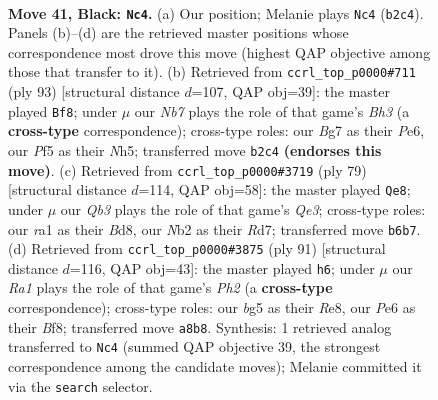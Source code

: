 \documentclass[11pt]{article}
\begin{document}
\clearpage

\begin{figure}[p]\centering
\begin{subfigure}{0.46\textwidth}\centering
\resizebox{\linewidth}{!}{%
\newchessgame
\chessboard[
  setfen={r3k3/6bp/bq2p3/p2p1pB1/P2p1Q1P/5N2/1n3P2/RNR3K1 b - - 3 41},
  showmover=false,
  pgfstyle=straightmove, color=movearrow, markmove={b2-c4}
]}
\caption{}
\end{subfigure}\hfill
\begin{subfigure}{0.46\textwidth}\centering
\resizebox{\linewidth}{!}{%
\newchessgame
\chessboard[
  setfen={4r1k1/1p3q2/1N2p2b/P2p1p1n/1R3P1P/3P1Q1P/5B2/6K1 b - - 4 47},
  showmover=false,
  pgfstyle=straightmove, color=movearrow, markmove={h6-f8}
]}
\caption{}
\end{subfigure}
\\[4pt]
\begin{subfigure}{0.46\textwidth}\centering
\resizebox{\linewidth}{!}{%
\newchessgame
\chessboard[
  setfen={3b2k1/1b1r4/2p1qppQ/4p2p/1P2P2P/5N2/3B1PP1/R5K1 b - - 1 40},
  showmover=false,
  pgfstyle=straightmove, color=movearrow, markmove={e6-e8}
]}
\caption{}
\end{subfigure}\hfill
\begin{subfigure}{0.46\textwidth}\centering
\resizebox{\linewidth}{!}{%
\newchessgame
\chessboard[
  setfen={4rbk1/7p/pn2q3/2p1Pp2/5p2/P2Q1N1P/6PK/BR6 b - - 0 46},
  showmover=false,
  pgfstyle=straightmove, color=movearrow, markmove={h7-h6}
]}
\caption{}
\end{subfigure}
\caption{\textbf{Move 41, Black: \texttt{Nc4}.} (a) Our position; Melanie plays \texttt{Nc4} (\texttt{b2c4}). Panels (b)--(d) are the retrieved master positions whose correspondence most drove this move (highest QAP objective among those that transfer to it). (b) Retrieved from \texttt{ccrl\_top\_p0000\#711} (ply 93) [structural distance $d$=107, QAP obj=39]: the master played \texttt{Bf8}; under $\mu$ our \emph{Nb7} plays the role of that game's \emph{Bh3} (a \textbf{cross-type} correspondence); cross-type roles: our \emph{B}g7 as their \emph{P}e6, our \emph{P}f5 as their \emph{N}h5; transferred move \texttt{b2c4} \textbf{(endorses this move)}. (c) Retrieved from \texttt{ccrl\_top\_p0000\#3719} (ply 79) [structural distance $d$=114, QAP obj=58]: the master played \texttt{Qe8}; under $\mu$ our \emph{Qb3} plays the role of that game's \emph{Qe3}; cross-type roles: our \emph{r}a1 as their \emph{B}d8, our \emph{N}b2 as their \emph{R}d7; transferred move \texttt{b6b7}. (d) Retrieved from \texttt{ccrl\_top\_p0000\#3875} (ply 91) [structural distance $d$=116, QAP obj=43]: the master played \texttt{h6}; under $\mu$ our \emph{Ra1} plays the role of that game's \emph{Ph2} (a \textbf{cross-type} correspondence); cross-type roles: our \emph{b}g5 as their \emph{R}e8, our \emph{P}e6 as their \emph{B}f8; transferred move \texttt{a8b8}. Synthesis: 1 retrieved analog transferred to \texttt{Nc4} (summed QAP objective 39, the strongest correspondence among the candidate moves); Melanie committed it via the \texttt{search} selector.}
\label{fig:thought-m81}
\end{figure}
\end{document}
